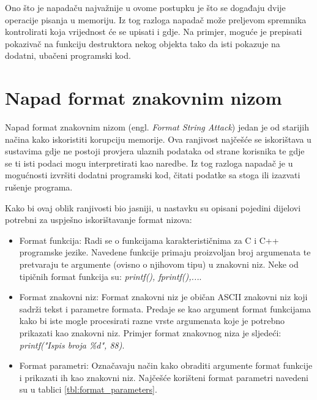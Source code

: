 \documentclass[times, utf8, diplomski, numeric]{fer}
\begin{document}
Ono što je napadaču najvažnije u ovome postupku je što se
događaju dvije operacije pisanja u memoriju. Iz tog razloga
napadač može preljevom spremnika kontrolirati koja vrijednost će
se upisati i gdje. Na primjer, moguće je prepisati pokazivač na
funkciju destruktora nekog objekta tako da isti pokazuje na
dodatni, ubačeni programski kod.

\section{Napad format znakovnim nizom}

Napad format znakovnim nizom (engl. \emph{Format String Attack}) 
jedan je od starijih načina kako iskoristiti korupciju memorije.
Ova ranjivost najčešće se iskorištava u sustavima gdje ne postoji
provjera ulaznih podataka od strane korisnika te gdje se ti isti
podaci mogu interpretirati kao naredbe. Iz tog razloga napadač je
u mogućnosti izvršiti dodatni programski kod, čitati podatke sa stoga ili
izazvati rušenje programa. 

Kako bi ovaj oblik ranjivosti bio jasniji, u nastavku su opisani
pojedini dijelovi potrebni za uspješno iskorištavanje format
nizova:

\begin{itemize}
\item Format funkcija: Radi se o funkcijama karakterističnima za
C i C++ programske jezike. Navedene funkcije primaju proizvoljan
broj argumenata te pretvaraju te argumente (ovisno o njihovom
tipu) u znakovni niz. Neke od tipičnih format funkcija su:
\emph{printf(), fprintf(),...}. 

\item Format znakovni niz: Format znakovni niz je običan ASCII
znakovni niz koji sadrži tekst i parametre formata. Predaje se
kao argument format funkcijama kako bi iste mogle procesirati				%
razne vrste argumenata koje je potrebno prikazati kao znakovni
niz. Primjer format znakovnog niza je sljedeći:
\emph{printf("Ispis broja \%d", 88)}.

\item Format parametri: Označavaju način kako obraditi argumente
format funkcije i prikazati ih kao znakovni niz. Najčešće
korišteni format parametri navedeni su u tablici 					%
\ref{tbl:format_parameters}.
\end{itemize}
\end{document}
